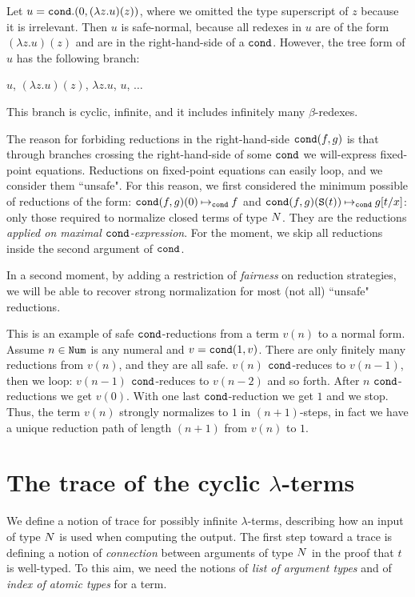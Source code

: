 \documentclass{article}
\begin{document}

\begin{Eg}
Let $u = {\tt cond}. (0, (\lambda z.u)(z) )$, where we omitted the type superscript
of $z$ because it is irrelevant. Then $u$ is safe-normal, because
all redexes in $u$ are of the form  $(\lambda z.u)(z)$ and are in the right-hand-side of a ${\tt cond}$. 
However, the tree form of $u$ has the following branch:
\begin{center}
  $u$, \quad
  $(\lambda z.u)(z)$, \quad
  $\lambda z.u$, \quad
  $u$, \quad $\ldots$
\end{center}
This branch is cyclic, infinite,
and it includes infinitely many $\beta$-redexes.
\end{Eg}

The reason for forbiding
reductions in the right-hand-side ${\tt cond}(f,g)$ is that through branches crossing the right-hand-side
of some ${\tt cond}$ we will-express fixed-point equations.
Reductions on fixed-point equations can easily loop, and we consider them ``unsafe". 
For this reason, we first considered the minimum possible of reductions of the form:
${\tt cond}(f,g)(0) \mathbin{\mapsto}_{\tt cond} f$ and
${\tt cond}(f,g)({\tt S} (t)) \mathbin{\mapsto}_{\tt cond} g[t/x]$: only  those required to normalize closed
terms of type ${N}$. They are the reductions \emph{applied on maximal ${\tt cond}$-expression}.
For the moment, we skip all reductions inside the second argument of ${\tt cond}$.

In a second moment, 
by adding a restriction of \emph{fairness} on reduction strategies,
we will be able to recover strong normalization for most (not all) ``unsafe" reductions.

\begin{Eg}
This is an example of safe ${\tt cond}$-reductions from a term $v(n)$ to a normal form. 
Assume $n \in {\tt Num}$ is any numeral and $v = {\tt cond}(1, v)$. There are only finitely many reductions
from $v(n)$, and they are all safe. $v(n)$ ${\tt cond}$-reduces to $v(n-1)$, 
then we loop: $v(n-1)$ ${\tt cond}$-reduces to $v(n-2)$ and so forth.
After $n$ ${\tt cond}$-reductions we get $v(0)$. With one last ${\tt cond}$-reduction we get $1$ and we stop. 
Thus, the term $v(n)$ strongly normalizes to $1$ in $(n+1)$-steps, in fact we have a unique reduction path of
length $(n+1)$ from $v(n)$ to $1$.
\end{Eg}

\section{The trace of the cyclic $\lambda$-terms}
We define a notion of trace for possibly infinite $\lambda$-terms, 
describing how an input of type ${N}$ is used when computing the output.
The first step toward a trace is defining a notion of \emph{connection} between arguments
of type ${N}$ in the proof that $t$ is well-typed. 
To this aim, we need the notions of \emph{list of argument
 types} and of \emph{index of atomic types} for a term.
\end{document}
